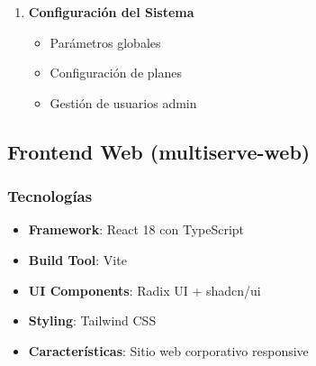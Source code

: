 \documentclass[12pt,a4paper]{article}
\begin{document}
\begin{enumerate}
    \item \textbf{Configuración del Sistema}
    \begin{itemize}
        \item Parámetros globales
        \item Configuración de planes
        \item Gestión de usuarios admin
    \end{itemize}
\end{enumerate}

\subsection{Frontend Web (multiserve-web)}

\subsubsection{Tecnologías}
\begin{itemize}
    \item \textbf{Framework}: React 18 con TypeScript
    \item \textbf{Build Tool}: Vite
    \item \textbf{UI Components}: Radix UI + shadcn/ui
    \item \textbf{Styling}: Tailwind CSS
    \item \textbf{Características}: Sitio web corporativo responsive
\end{itemize}
\end{document}
